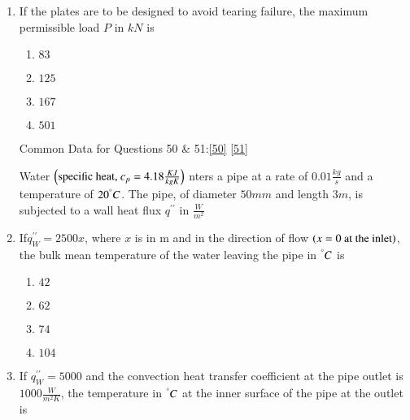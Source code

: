 \documentclass[journal]{IEEEtran}
\numberwithin{equation}{enumi}
\numberwithin{figure}{enumi}
\begin{document}
\begin{enumerate}
    \item 
    If the plates are to be designed to avoid tearing failure, the maximum permissible load $P$ in $kN$ is \label{49}
    \hfill{}

    \begin{multicols}{4}
        \begin{enumerate}
            \item $83$
            \item $125$
            \item $167$
            \item $501$
        \end{enumerate}
    \end{multicols}


    \begin{center}
        Common Data for Questions 50 \& 51:\ref{50} \ref{51}
    \end{center}
    Water $\left(\text{specific heat, } c_p = 4.18 \frac{KJ}{kgK}\right)$ nters a pipe at a rate of $0.01 \frac{kg}{s}$ and a temperature of $20^\degree C$. The pipe, of diameter $50 mm$ and length $3 m$, is subjected to a wall heat flux $q^{\prime\prime}$ in $\frac{W}{m^2}$\\
    
    \item 
    If$q_W^{\prime\prime} = 2500x $, where $x$ is in m and in the direction of flow $\left(x = 0\text{ at the inlet}\right)$, the bulk mean temperature of the water leaving the pipe in $^\degree C$ is \label{50}
    \hfill{}

    \begin{multicols}{4}
        \begin{enumerate}
            \item $42$
            \item $62$
            \item $74$
            \item $104$
        \end{enumerate}
    \end{multicols}

    \item
    If $q_W^{\prime\prime} = 5000$ and the convection heat transfer coefficient at the pipe outlet is $1000\frac{W}{m^2K}$, the temperature in $^\degree C$ at the inner surface of the pipe at the outlet is \label{51}
    \hfill{}


\end{enumerate}
\end{document}
